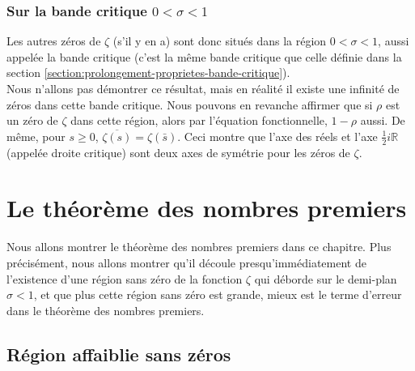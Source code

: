\documentclass[french]{report}
\begin{document}
\subsection{Sur la bande critique $0<\sigma<1$}

Les autres zéros de $\zeta$ (s'il y en a) sont donc situés dans la région $0<\sigma<1$, aussi appelée la bande critique (c'est la même bande critique que celle définie dans la section \ref{section:prolongement-proprietes-bande-critique}).
\\

Nous n'allons pas démontrer ce résultat, mais en réalité il existe une infinité de zéros dans cette bande critique. Nous pouvons en revanche affirmer que si $\rho$ est un zéro de $\zeta$ dans cette région, alors par l'équation fonctionnelle, $1-\rho$ aussi. De même, pour $s\geq0$, $\overline{\zeta(s)}=\zeta(\bar{s})$. Ceci montre que l'axe des réels et l'axe $\frac{1}{2}i\mathbb{R}$ (appelée droite critique) sont deux axes de symétrie pour les zéros de $\zeta$.

\chapter{Le théorème des nombres premiers}

Nous allons montrer le théorème des nombres premiers dans ce chapitre. Plus précisément, nous allons montrer qu'il découle presqu'immédiatement de l'existence d'une région sans zéro de la fonction $\zeta$ qui déborde sur le demi-plan $\sigma<1$, et que plus cette région sans zéro est grande, mieux est le terme d'erreur dans le théorème des nombres premiers.

\section{Région affaiblie sans zéros}\label{section:region-affaiblie}
\end{document}
